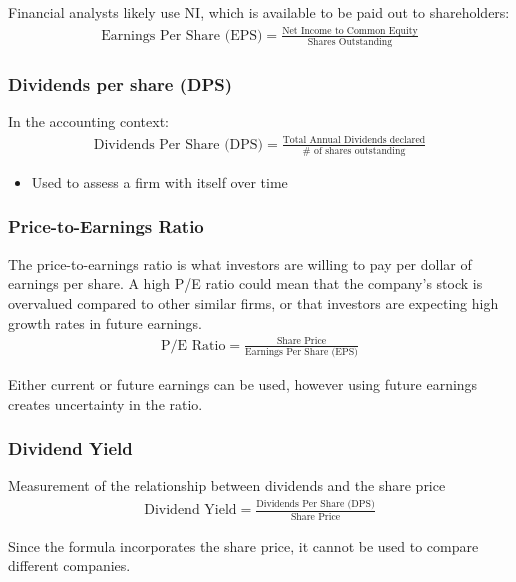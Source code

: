 \documentclass{article}
\begin{document}
			Financial analysts likely use NI, which is available to be paid out to shareholders:
			\begin{align*}
				\text{Earnings Per Share (EPS)} = \frac{\text{Net Income to Common Equity}}{\text{Shares Outstanding}}
			\end{align*}

		\subsubsection{Dividends per share (DPS)}

			In the accounting context:
			\begin{align*}
				\text{Dividends Per Share (DPS)} = \frac{\text{Total Annual Dividends declared}}{\text{# of shares outstanding}}
			\end{align*}
			\begin{itemize}
				\item Used to assess a firm with itself over time
			\end{itemize}

		\subsubsection{Price-to-Earnings Ratio}

			The price-to-earnings ratio is what investors are willing to pay per dollar of earnings per share. A high P/E ratio could mean that the company's stock is overvalued compared to other similar firms, or that investors are expecting high growth rates in future earnings.
			\begin{align*}
				\text{P/E Ratio} = \frac{\text{Share Price}}{\text{Earnings Per Share (EPS)}}
			\end{align*}

			Either current or future earnings can be used, however using future earnings creates uncertainty in the ratio.

		\subsubsection{Dividend Yield}

			Measurement of the relationship between dividends and the share price
			\begin{align*}
				\text{Dividend Yield} = \frac{\text{Dividends Per Share (DPS)}}{\text{Share Price}}
			\end{align*}

			Since the formula incorporates the share price, it cannot be used to compare different companies.
\end{document}
